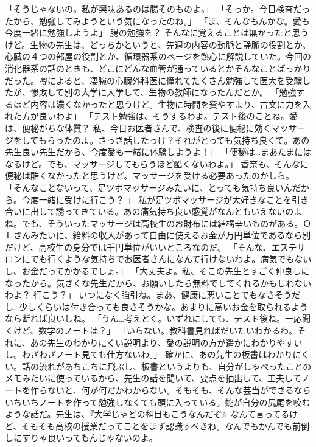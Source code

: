「そうじゃないの。私が興味あるのは腸そのものよ。」
「そっか。今日検査だったから、勉強してみようという気になったのね。」
「ま、そんなもんかな。愛も今度一緒に勉強しようよ」
腸の勉強を？ そんなに覚えることは無かったと思うけど。生物の先生は、どっちかというと、先週の内容の動脈と静脈の役割とか、心臓の４つの部屋の役割とか、循環器系のページを熱心に解説していた。今回の消化器系の話のときも、どこにどんな血管が通っているとかそんなことばっかりだった。噂によると、凄腕の心臓外科医に憧れてたくさん勉強して医大を受験したが、惨敗して別の大学に入学して、生物の教師になったんだとか。
「勉強するほど内容は濃くなかったと思うけど。生物に時間を費やすより、古文に力を入れた方が良いわよ」
「テスト勉強は、そうするわよ。テスト後のことね。愛は、便秘がちな体質？ 私、今日お医者さんで、検査の後に便秘に効くマッサージをしてもらったのよ。さっき話したっけ？それがとっても気持ち良くて。あの先生良い先生だから、今度愛も一緒に体験しようよ！」
「便秘は…まあたまにはなるけど。でも、マッサージしてもらうほど酷くないわよ。」
香奈も、そんなに便秘は酷くなかったと思うけど。マッサージを受ける必要あったのかしら。
「そんなことないって、足ツボマッサージみたいに、とっても気持ち良いんだから。今度一緒に受けに行こう？ 」
私が足ツボマッサージが大好きなことを引き合いに出して誘ってきている。あの痛気持ち良い感覚がなんともいえないのよね。でも、そういったマッサージは高校生のお財布には結構辛いものがある。ＯＬさんみたいに、給料の収入があって自由に使えるお金が万円単位であるなら別だけど、高校生の身分では千円単位がいいところなのだ。
「そんな、エステサロンにでも行くような気持ちでお医者さんになんて行けないわよ。病気でもないし、お金だってかかるでしょ。」
「大丈夫よ。私、そこの先生とすごく仲良しになったから。気さくな先生だから、お願いしたら無料でしてくれるかもしれないわよ？ 行こう？」
いつになく強引ね。まあ、健康に悪いことでもなさそうだし…少しくらいは付き合っても良さそうかな。あまりに高いお金を取られるようなら断れば良いしね。
「うん…考えとく。いずれにしても、テスト後ね。一応聞くけど、数学のノートは？」
「いらない。教科書見ればだいたいわかるわ。それに、あの先生のわかりにくい説明より、愛の説明の方が遥かにわかりやすいし。わざわざノート見ても仕方ないわ。」
確かに、あの先生の板書はわかりにくい。話の流れがあちこちに飛ぶし、板書というよりも、自分がしゃべったことのメモみたいに使っているから、先生の話を聞いて、要点を抽出して、工夫してノートを作らないと、何が何だかわからない。そもそも、そんな芸当ができるならいちいちノートを作って勉強しなくても頭に入っている。蛇が自分の尻尾を咬むような話だ。先生は、『大学じゃどの科目もこうなんだぞ』なんて言ってるけど、そもそも高校の授業だってことをまず認識すべきね。なんでもかんでも前倒しにすりゃ良いってもんじゃないのよ。
